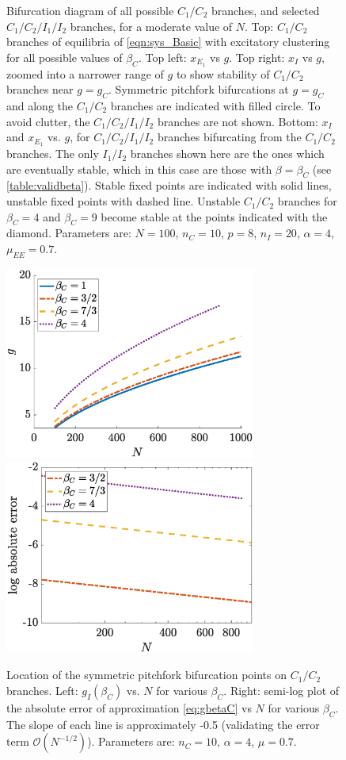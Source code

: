 \documentclass[reqno]{siamonline190516}
\begin{document}
\begin{figure}
    \caption{Bifurcation diagram of all possible $C_1/C_2$ branches, and selected $C_1/C_2/I_1/I_2$ branches, for a moderate value of $N$. Top: $C_1/C_2$ branches of equilibria of \cref{eqn:sys_Basic} with excitatory clustering for all possible values of $\beta_C$. Top left: $x_{E_1}$ vs $g$. Top right: $x_I$ vs $g$, zoomed into a narrower range of $g$ to show stability of $C_1/C_2$ branches near $g = g_C$. Symmetric pitchfork bifurcations at $g = g_C$ and along the $C_1/C_2$ branches are indicated with filled circle. To avoid clutter, the $C_1/C_2/I_1/I_2$ branches are not shown. Bottom: $x_I$ and $x_{E_1}$ vs. $g$, for $C_1/C_2/I_1/I_2$ branches bifurcating from the $C_1/C_2$ branches. The only $I_1/I_2$ branches shown here are the ones which are eventually stable, which in this case are those with $\beta = \beta_C$ (see \cref{table:validbeta}). Stable fixed points are indicated with solid lines, unstable fixed points with dashed line. Unstable $C_1/C_2$ branches for $\beta_C = 4$ and $\beta_C = 9$ become stable at the points indicated with the diamond. Parameters are: $N = 100$, $n_C = 10$, $p = 8$, $n_I = 20$, $\alpha = 4$, $\mu_{EE} = 0.7$.}
    \label{fig:clusterBD2}
\end{figure}

\begin{figure}
    \centering
    \includegraphics[width=8.25cm]{clusterpitchgvsN.eps}\hspace{-0.5cm}
    \includegraphics[width=8.25cm]{pitcherrorsemilog.eps}
    \caption{Location of the symmetric pitchfork bifurcation points on $C_1/C_2$ branches. Left:  $g_I(\beta_C)$ vs. $N$ for various $\beta_C$. Right: semi-log plot of the absolute error of approximation \cref{eq:gbetaC} vs $N$ for various $\beta_C$. The slope of each line is approximately -0.5 (validating the error term $\mathcal{O}(N^{-1/2})$). Parameters are: $n_C = 10$, $\alpha = 4$, $\mu = 0.7$.}
    \label{fig:pitcherror}
\end{figure}
\end{document}
